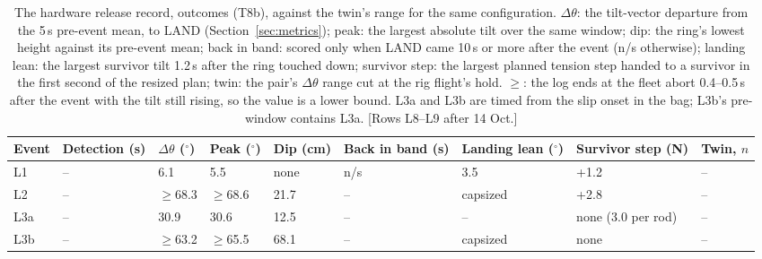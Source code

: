 \begin{table}[htbp]
  \centering
  \footnotesize
  \caption{The hardware release record, outcomes (T8b), against the twin's range for the same configuration.
  $\Delta\theta$: the tilt-vector departure from the 5\,s pre-event mean, to LAND (Section~\ref{sec:metrics}); peak:
  the largest absolute tilt over the same window; dip: the ring's lowest height against its pre-event mean; back in
  band: scored only when LAND came 10\,s or more after the event (n/s otherwise); landing lean: the largest survivor
  tilt 1.2\,s after the ring touched down; survivor step: the largest planned tension step handed to a survivor in the
  first second of the resized plan; twin: the pair's $\Delta\theta$ range cut at the rig flight's hold. $\geq$: the log
  ends at the fleet abort 0.4--0.5\,s after the event with the tilt still rising, so the value is a lower bound. L3a and
  L3b are timed from the slip onset in the bag; L3b's pre-window contains L3a. [Rows L8--L9 after 14 Oct.]}
  \label{tab:T8b}
  \begin{tabularx}{\textwidth}{lYYYYYYYY}
    \toprule
    Event & Detection (s) & $\Delta\theta$ ($^\circ$) & Peak ($^\circ$) & Dip (cm) & Back in band (s) & Landing lean ($^\circ$)
      & Survivor step (N) & Twin, $n$ \\
    \midrule
    L1 & -- & 6.1 & 5.5 & none & n/s & 3.5 & +1.2 & -- \\ %
    L2 & -- & $\geq$68.3 & $\geq$68.6 & 21.7 & -- & capsized & +2.8 & -- \\ %
    L3a & -- & 30.9 & 30.6 & 12.5 & -- & -- & none (3.0 per rod) & -- \\ %
    L3b & -- & $\geq$63.2 & $\geq$65.5 & 68.1 & -- & capsized & none & -- \\ %

\end{tabularx}
\end{table}
